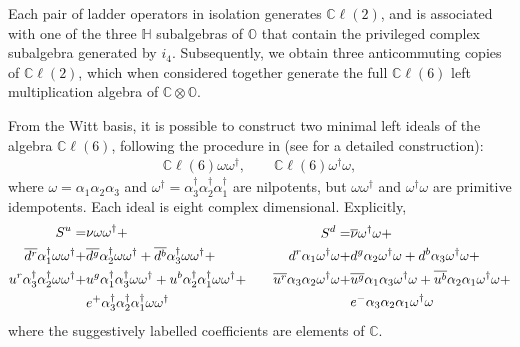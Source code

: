 \documentclass{article}
\newcommand{\bb}[1]{\mathbb{#1}}
\begin{document}
Each pair of ladder operators in isolation generates $\bb{C}\ell(2)$, and is associated with one of the three $\bb{H}$ subalgebras of $\bb{O}$ that contain the privileged complex subalgebra generated by $i_4$. Subsequently, we obtain three anticommuting copies of $\bb{C}\ell(2)$, which when considered together generate the full $\bb{C}\ell(6)$ left multiplication algebra of $\bb{C}\otimes\bb{O}$.

From the Witt basis, it is possible to construct two minimal left ideals of the algebra $\bb{C}\ell(6)$, following the procedure in \cite{ablamowicz1995construction} (see \cite{furey2016standard} for a detailed construction):
\begin{eqnarray}
\bb{C}\ell(6)\omega\omega^{\dagger},\qquad \bb{C}\ell(6)\omega^{\dagger}\omega,
\end{eqnarray}
where $\omega = \alpha_1\alpha_2\alpha_3$ and $\omega^\dagger = \alpha_3^\dagger\alpha_2^\dagger\alpha_1^\dagger$ are nilpotents, but $\omega\omega^{\dagger}$ and $\omega^{\dagger}\omega$ are primitive idempotents. Each ideal is eight complex dimensional. Explicitly,
\begin{equation} \notag
 \begin{split}
     S^u=&{\nu}\omega\omega^\dagger + \\  \overline{d^r}{\alpha_1^\dagger}\omega\omega^\dagger + &\overline{d^g}{\alpha_2^\dagger}\omega\omega^\dagger + \overline{d^b}{\alpha_3^\dagger}\omega\omega^\dagger + \\ u^r{\alpha_3^\dagger}{\alpha_2^\dagger}\omega\omega^\dagger + &u^g{\alpha_1^\dagger}{\alpha_3^\dagger}\omega\omega^\dagger + u^b{\alpha_2^\dagger}{\alpha_1^\dagger}\omega\omega^\dagger + \\ &e^+{\alpha_3^\dagger}{\alpha_2^\dagger}{\alpha_1^\dagger}\omega\omega^\dagger
\end{split}
\qquad 
\begin{split}
     S^d=&{\overline{\nu}}\omega^\dagger\omega + \\ {d}^r{\alpha_1}\omega^\dagger\omega + &{d}^g{\alpha_2}\omega^\dagger\omega +  {d}^b{\alpha_3}\omega^\dagger\omega + \\ \overline{u^r}{\alpha_3}{\alpha_2}\omega^\dagger\omega + &\overline{u^g}{\alpha_1}{\alpha_3}\omega^\dagger\omega + \overline{u^b}{\alpha_2}{\alpha_1}\omega^\dagger\omega + \\ &e^-{\alpha_3}{\alpha_2}{\alpha_1}\omega^\dagger\omega
\end{split}
\end{equation}
where the suggestively labelled coefficients are elements of $\bb{C}$. 
\end{document}

